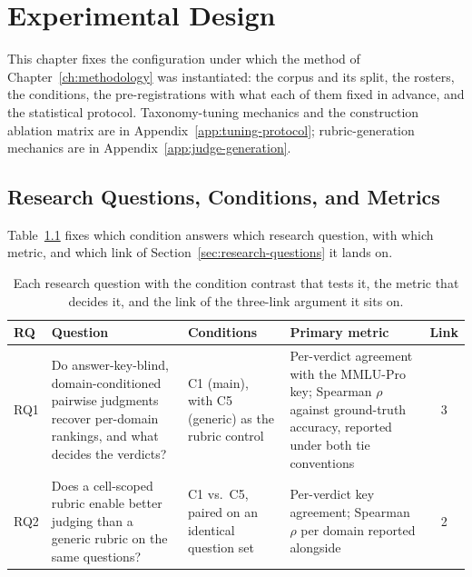 \chapter{Experimental Design}\label{ch:experimental-design}

This chapter fixes the configuration under which the method of
Chapter~\ref{ch:methodology} was instantiated: the corpus and its
split, the rosters, the conditions, the pre-registrations with what
each of them fixed in advance, and the statistical protocol.
Taxonomy-tuning mechanics and the construction ablation matrix are in
Appendix~\ref{app:tuning-protocol}; rubric-generation mechanics are in
Appendix~\ref{app:judge-generation}.

\section{Research Questions, Conditions, and Metrics}\label{sec:exp-rqmap}

Table~\ref{tab:rq-map} fixes which condition answers which research
question, with which metric, and which link of
Section~\ref{sec:research-questions} it lands on.

\begin{table}[htbp]
    \centering
    \caption{Each research question with the condition contrast that
tests it, the metric that decides it, and the link of the
three-link argument it sits on.}
    \label{tab:rq-map}
    \begin{tabular}{p{0.9cm}p{4.0cm}p{2.6cm}p{4.0cm}c}
        \toprule
        RQ & Question & Conditions & Primary metric & Link \\
        \midrule
        RQ1 & Do answer-key-blind, domain-conditioned pairwise
        judgments recover per-domain rankings, and what decides the
        verdicts?
        & C1 (main), with C5 (generic) as the rubric control
        & Per-verdict agreement with the MMLU-Pro key; Spearman $\rho$
        against ground-truth accuracy, reported under both tie
        conventions & 3 \\
        \addlinespace
        RQ2 & Does a cell-scoped rubric enable better judging
        than a generic rubric on the same questions?
        & C1 vs.\ C5, paired on an identical question set
        & Per-verdict key agreement; Spearman $\rho$ per domain
        reported alongside & 2 \\
        \bottomrule
    \end{tabular}
\end{table}


